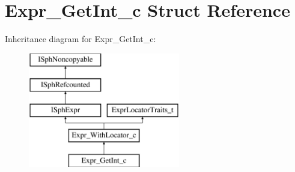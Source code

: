 \hypertarget{structExpr__GetInt__c}{\section{Expr\-\_\-\-Get\-Int\-\_\-c Struct Reference}
\label{structExpr__GetInt__c}
}
Inheritance diagram for Expr\-\_\-\-Get\-Int\-\_\-c\-:\begin{figure}[H]
\begin{center}
\leavevmode
\includegraphics[height=5.000000cm]{structExpr__GetInt__c}
\end{center}
\end{figure}
